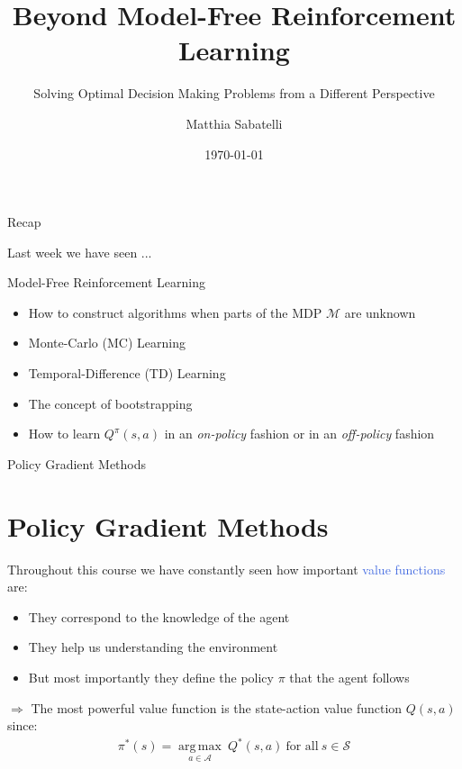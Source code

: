 \documentclass{beamer}
\title{Beyond Model-Free Reinforcement Learning}
\subtitle{Solving Optimal Decision Making Problems from a Different Perspective}
\author{Matthia Sabatelli}
\date{\today}
\DeclareMathOperator*{\argmax}{arg\,max}
\begin{document}
\frame{\titlepage} 

\begin{frame}{Recap}

	Last week we have seen ...
	\begin{block}{Model-Free Reinforcement Learning}
		\begin{itemize}
			\item How to construct algorithms when parts of the MDP $\mathcal{M}$ are unknown
			\item Monte-Carlo (MC) Learning
			\item Temporal-Difference (TD) Learning
			\item The concept of bootstrapping
			\item How to learn $Q^{\pi}(s,a)$ in an \textit{on-policy} fashion or in an \textit{off-policy} fashion
		\end{itemize}
	\end{block}

\end{frame}





\begin{frame}{Policy Gradient Methods}
	\section{Policy Gradient Methods}
	Throughout this course we have constantly seen how important \textcolor{RoyalBlue}{value functions} are:
	\begin{itemize}
		\item They correspond to the knowledge of the agent
		\item They help us understanding the environment
		\item But most importantly they define the policy $\pi$ that the agent follows
	\end{itemize}

	\bigskip

	$\Rightarrow$ The most \textcolor{skymagenta}{powerful} value function is the state-action value function $Q(s,a)$ since:
	\begin{align*}
		\pi^{*}(s) = \underset{a\in\mathcal{A}}{\argmax} \ Q^{*}(s,a) \ \text{for all} \ s \in \mathcal{S}
	\end{align*}

\end{frame}
\end{document}
